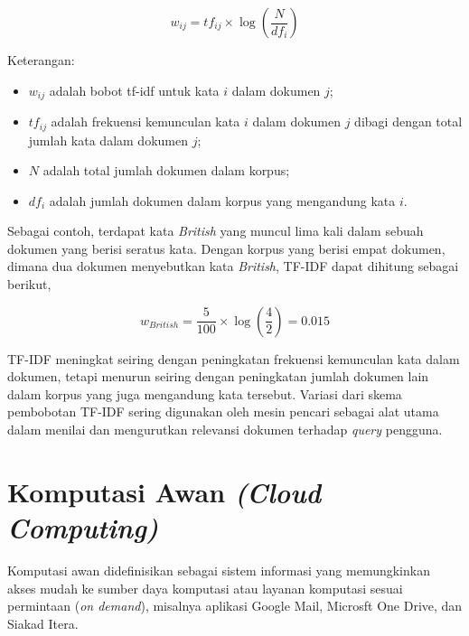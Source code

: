 \begin{equation}
w_{ij} = tf_{ij} \times \log \left(\frac{N}{df_i}\right)
\end{equation}

Keterangan:

\begin{itemize}
    \item $w_{ij}$ adalah bobot tf-idf untuk kata $i$ dalam dokumen $j$;
    \item $tf_{ij}$ adalah frekuensi kemunculan kata $i$ dalam dokumen $j$ dibagi dengan total jumlah kata dalam dokumen $j$;
    \item $N$ adalah total jumlah dokumen dalam korpus;
    \item $df_i$ adalah jumlah dokumen dalam korpus yang mengandung kata $i$.
\end{itemize}

Sebagai contoh, terdapat kata \textit{British} yang muncul lima kali dalam sebuah dokumen yang berisi seratus kata. Dengan korpus yang berisi empat dokumen, dimana dua dokumen menyebutkan kata \textit{British}, TF-IDF dapat dihitung sebagai berikut,

\begin{equation*}
w_{British} = \frac{5}{100} \times \log \left(\frac{4}{2}\right) = 0.015
\end{equation*}

TF-IDF meningkat seiring dengan peningkatan frekuensi kemunculan kata dalam dokumen, tetapi menurun seiring dengan peningkatan jumlah dokumen lain dalam korpus yang juga mengandung kata tersebut. Variasi dari skema pembobotan TF-IDF sering digunakan oleh mesin pencari sebagai alat utama dalam menilai dan mengurutkan relevansi dokumen terhadap \textit{query} pengguna.

\section{Komputasi Awan \textit{(Cloud Computing)}}
Komputasi awan didefinisikan sebagai sistem informasi yang memungkinkan akses mudah ke sumber daya komputasi atau layanan komputasi sesuai permintaan (\textit{on demand}), misalnya  aplikasi Google Mail, Microsft One Drive, dan Siakad Itera.

